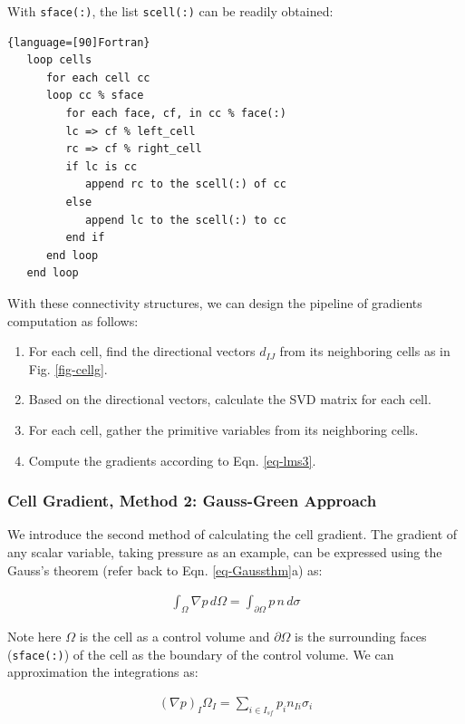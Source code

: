 \documentclass[12pt, letterpaper]{report}
\begin{document}
With \verb+sface(:)+, the list \verb+scell(:)+ can be readily obtained:

\begin{lstlisting}{language=[90]Fortran}
   loop cells
      for each cell cc
      loop cc % sface
         for each face, cf, in cc % face(:)
         lc => cf % left_cell
         rc => cf % right_cell
         if lc is cc
            append rc to the scell(:) of cc
         else
            append lc to the scell(:) to cc
         end if
      end loop
   end loop
\end{lstlisting}

With these connectivity structures, we can design the pipeline of gradients computation as follows:

\begin{enumerate}
   \item For each cell, find the directional vectors $d_{IJ}$ from its neighboring cells as in Fig.
      \ref{fig-cellg}.
   \item Based on the directional vectors, calculate the SVD matrix for each cell.
   \item For each cell, gather the primitive variables from its neighboring cells.
   \item Compute the gradients according to Eqn. \ref{eq-lms3}.
\end{enumerate}

\subsubsection{Cell Gradient, Method 2: Gauss-Green Approach}

We introduce the second method of calculating the cell gradient. The gradient of any scalar
variable, taking pressure as an example, can be expressed using the Gauss's theorem (refer back to
Eqn. \ref{eq-Gaussthm}a) as:

\begin{align*}
   \int_{\Omega} \nabla p \, d\Omega = \int_{\partial\Omega} p \, n \, d\sigma
\end{align*}

Note here $\Omega$ is the cell as a control volume and $\partial\Omega$ is the surrounding faces
(\verb+sface(:)+) of the cell as the boundary of the control volume. We can approximation the
integrations as:

\begin{align*}
   (\nabla p)_I \Omega_I = \sum_{i \in I_{sf}} p_i n_{Ii} \sigma_i
\end{align*}
\end{document}
